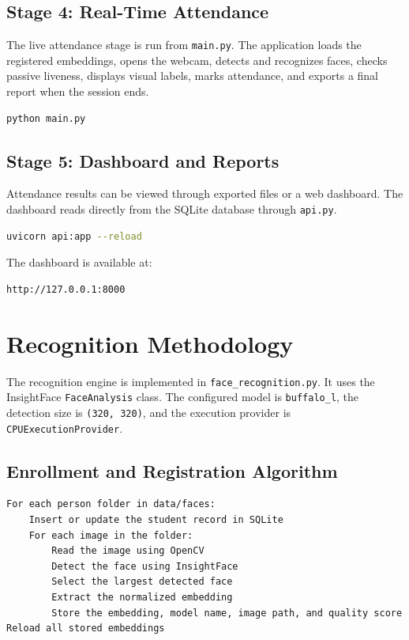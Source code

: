 \documentclass[12pt,a4paper]{report}
\newcommand{\JustifiedNormal}{\fontsize{12}{14}\selectfont\justifying\setlength{\parindent}{0pt}}
\begin{document}
\subsection{Stage 4: Real-Time Attendance}
\JustifiedNormal
The live attendance stage is run from \texttt{main.py}. The application loads the registered embeddings, opens the webcam, detects and recognizes faces, checks passive liveness, displays visual labels, marks attendance, and exports a final report when the session ends.

\begin{lstlisting}[language=bash,caption={Real-time attendance command}]
python main.py
\end{lstlisting}

\subsection{Stage 5: Dashboard and Reports}
\JustifiedNormal
Attendance results can be viewed through exported files or a web dashboard. The dashboard reads directly from the SQLite database through \texttt{api.py}.

\begin{lstlisting}[language=bash,caption={Dashboard command}]
uvicorn api:app --reload
\end{lstlisting}

The dashboard is available at:

\begin{lstlisting}[language=bash]
http://127.0.0.1:8000
\end{lstlisting}

\section{Recognition Methodology}
\JustifiedNormal
The recognition engine is implemented in \texttt{face\_recognition.py}. It uses the InsightFace \texttt{FaceAnalysis} class. The configured model is \texttt{buffalo\_l}, the detection size is \texttt{(320, 320)}, and the execution provider is \texttt{CPUExecutionProvider}.

\subsection{Enrollment and Registration Algorithm}
\JustifiedNormal
\begin{lstlisting}[caption={Embedding registration algorithm}]
For each person folder in data/faces:
    Insert or update the student record in SQLite
    For each image in the folder:
        Read the image using OpenCV
        Detect the face using InsightFace
        Select the largest detected face
        Extract the normalized embedding
        Store the embedding, model name, image path, and quality score
Reload all stored embeddings
\end{lstlisting}
\end{document}
